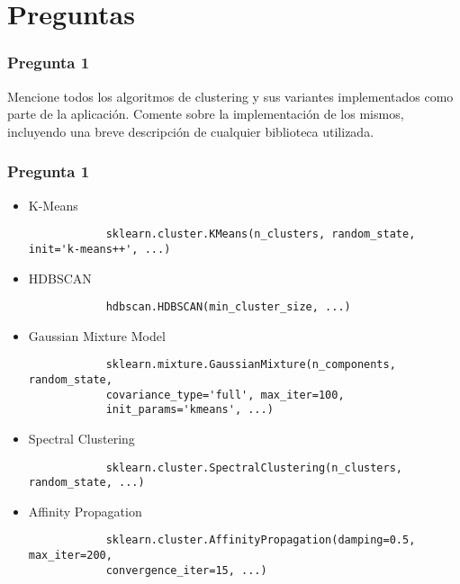 \section*{Preguntas}\label{sec:questions}

\begin{frame}
    \frametitle{Pregunta 1}

    Mencione todos los algoritmos de clustering y sus variantes implementados como parte de la aplicación.
    Comente sobre la implementación de los mismos, incluyendo una breve descripción de cualquier biblioteca utilizada.

\end{frame}

\begin{frame}[fragile]
    \frametitle{Pregunta 1}

    \begin{itemize}
        \item<1-> K-Means
        {\tiny
        \begin{verbatim}
            sklearn.cluster.KMeans(n_clusters, random_state, init='k-means++', ...)
        \end{verbatim}
        }

        \item<2-> HDBSCAN
        {\tiny
        \begin{verbatim}
            hdbscan.HDBSCAN(min_cluster_size, ...)
        \end{verbatim}
        }

        \item<3-> Gaussian Mixture Model
        {\tiny
        \begin{verbatim}
            sklearn.mixture.GaussianMixture(n_components, random_state,
            covariance_type='full', max_iter=100,
            init_params='kmeans', ...)
        \end{verbatim}
        }

        \item<4-> Spectral Clustering
        {\tiny
        \begin{verbatim}
            sklearn.cluster.SpectralClustering(n_clusters, random_state, ...)
        \end{verbatim}
        }

        \item<5-> Affinity Propagation
        {\tiny
        \begin{verbatim}
            sklearn.cluster.AffinityPropagation(damping=0.5, max_iter=200,
            convergence_iter=15, ...)
        \end{verbatim}
        }
    \end{itemize}

\end{frame}

